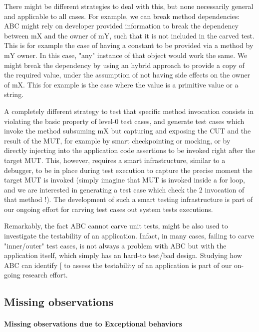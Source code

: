 \documentclass[10pt,conference]{IEEEtran}
\makeatletter
\gdef\xxx{\@ifnextchar[\xxx@lab\xxx@nolab}
\newcommand{\abc}{\textsf{ABC}\xspace}
\makeatother
\begin{document}
There might be different strategies to deal with this, but none necessarily general and applicable to all cases.
For example, we can break method dependencies: \abc might rely on developer provided information to break the dependency between mX and the owner of mY, such that it is not included in the carved test. This is for example the case of having a constant to be provided via a method by mY owner. In this case, "any" instance of that object would work the same. We might break the dependency by using an hybrid approach to provide a copy of the required value, under the assumption of not having side effects on the owner of mX. This for example is the case where the value is a primitive value or a string. 

A completely different strategy to test that specific method invocation consists in violating the basic property of level-0 test cases, and generate test cases which invoke the method subsuming mX but capturing and exposing the CUT and the result of the MUT, for example by smart checkpointing or mocking, or by directly injecting into the application code assertions to be invoked right after the target MUT. This, however, requires a smart infrastructure, similar to a debugger, to be in place during test execution to capture the precise moment the target MUT is invoked (simply imagine that MUT is invoked inside a for loop, and we are interested in generating a test case which check the 2 invocation of that method !). The development of such a smart testing infrastructure is part of our ongoing effort for carving test cases out system tests executions. 

Remarkably, the fact \abc cannot carve unit tests, might be also used to investigate the testability of an application. Infact, in many cases, failing to carve "inner/outer" test cases, is not always a problem with \abc but with the application itself, which simply has an hard-to test/bad design. Studying how \abc can identify \xxx{code smells} to assess the testability of an application is part of our on-going research effort.

\subsection{Missing observations}

\paragraph{Missing observations due to Exceptional behaviors}
\end{document}
